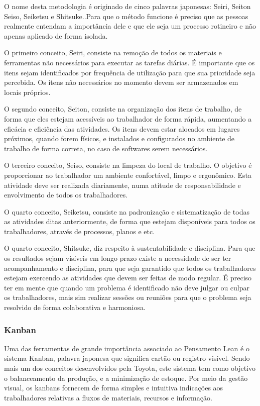 O nome desta metodologia é originado de cinco palavras japonesas: Seiri, Seiton Seiso, Seiketsu e Shitsuke..Para que o método funcione é preciso que as pessoas realmente entendam a importância dele e que ele seja um processo rotineiro e não apenas aplicado de forma isolada.

O primeiro conceito, Seiri, consiste na  remoção de todos os materiais e ferramentas não necessários para executar as tarefas diárias. É importante que os itens sejam identificados por frequência de utilização para que sua prioridade seja percebida. Os itens não necessários no momento devem ser armazenados em locais próprios. 

O segundo conceito, Seiton, consiste na organização dos itens de trabalho, de forma que eles estejam acessíveis ao trabalhador de forma rápida, aumentando a eficácia e eficiência das atividades. Os itens devem estar alocados em lugares próximos, quando forem físicos, e instalados e configurados no ambiente de trabalho de forma correta, no caso de softwares serem necessários.

O terceiro conceito, Seiso, consiste na limpeza do local de trabalho. O objetivo é proporcionar ao trabalhador um ambiente confortável, limpo e ergonômico. Esta atividade deve ser realizada diariamente, numa atitude de responsabilidade e envolvimento de todos os trabalhadores.

O quarto conceito, Seiketsu, consiste na padronização e sistematização de todas as atividades ditas anteriormente, de forma que estejam disponíveis para todos os trabalhadores, através de processos, planos e etc. 

O quarto conceito, Shitsuke, diz respeito à sustentabilidade e disciplina. Para que os resultados sejam visíveis em longo prazo existe a necessidade de ser ter acompanhamento e disciplina, para que seja garantido que todos os trabalhadores estejam exercendo as atividades que devem ser feitas de modo regular. É preciso ter em mente que quando um problema é identificado não deve julgar ou culpar os trabalhadores, mais sim realizar sessões ou reuniões para que o problema seja resolvido de forma colaborativa e harmoniosa. 

\subsubsection[Kanban]{Kanban}

Uma das ferramentas de grande importância associado ao Pensamento Lean é o sistema Kanban, palavra japonesa que significa cartão ou registro visível. Sendo mais um dos conceitos desenvolvidos pela Toyota, este sistema tem como objetivo o balanceamento da produção, e a minimização de estoque. Por meio da gestão visual, os kanbans fornecem de forma simples e intuitiva indicações aos trabalhadores relativas a fluxos de materiais, recursos e informação. 

